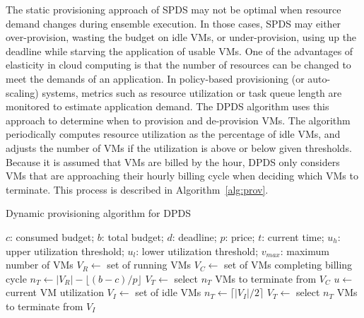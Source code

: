\documentclass{sig-alternate}
\begin{document}
The static provisioning approach of SPDS may not be optimal when resource demand
changes during ensemble execution. In those cases, SPDS may either over-provision, 
wasting the budget on idle VMs, or under-provision, using up the deadline while starving 
the application of usable VMs. One of the advantages of elasticity in cloud computing 
is that the number of resources can be changed to meet the demands of an application.
In policy-based provisioning (or auto-scaling) systems, metrics such as resource 
utilization or task queue length are monitored to estimate application demand.
The DPDS algorithm uses this approach to determine when to provision and de-provision VMs. The 
algorithm periodically computes resource utilization as the percentage of idle VMs, and
adjusts the number of VMs if the utilization is above or below given thresholds.
Because it is assumed that VMs are billed by the hour, DPDS only considers VMs that are
approaching their hourly billing cycle when deciding which VMs to terminate. This process
is described in Algorithm~\ref{alg:prov}.

\begin{algorithm}
\caption{Dynamic provisioning algorithm for DPDS}
\label{alg:prov}
\begin{algorithmic}[1]
\Require $c$: consumed budget; $b$: total budget; $d$: deadline; $p$: price;
$t$: current time; $u_h$: upper utilization threshold; $u_l$: lower utilization
threshold; $v_{max}$: maximum number of VMs
	\State $V_R\gets$ set of running VMs
    \State $V_C\gets$ set of VMs completing billing cycle
    	\State $n_T\gets |V_R| - \lfloor(b-c)/p\rfloor$
    	\State $V_T\gets$ select $n_T$ VMs to terminate from $V_C$
    	\State {} \label{l:terminate1}
    \Else 
		\State $u\gets$ current VM utilization
    		\State {}
    		\State $V_I\gets$ set of idle VMs
    		\State $n_T\gets \lceil|V_I|/2\rceil$ \label{l:nT2}
			\State $V_T\gets$ select $n_T$ VMs to terminate from $V_I$
    		\State {} \label{l:terminate2}
    	\EndIf 
    \EndIf
\EndProcedure
\end{algorithmic} 
\end{algorithm}
\end{document}
